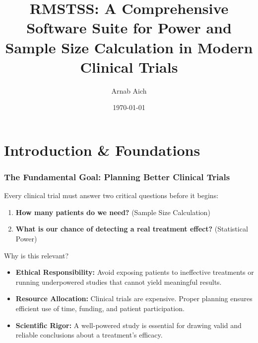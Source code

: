 \documentclass{beamer}
\date{}
\title[RMSTSS]{RMSTSS: A Comprehensive Software Suite for Power and Sample Size Calculation in Modern Clinical Trials}
\author{Arnab Aich}
\institute{Florida State University}
\date{\today}
\begin{document}
\begin{frame}
  \titlepage
\end{frame}

\section{Introduction \& Foundations}

\begin{frame}
\frametitle{The Fundamental Goal: Planning Better Clinical Trials}
Every clinical trial must answer two critical questions before it begins:

\begin{enumerate}
    \item \textbf{How many patients do we need?} (Sample Size Calculation)
    \item \textbf{What is our chance of detecting a real treatment effect?} (Statistical Power)
\end{enumerate}

\vspace{1em}

\begin{block}{Why is this relevant?}
\begin{itemize}
    \item \textbf{Ethical Responsibility:} Avoid exposing patients to ineffective treatments or running underpowered studies that cannot yield meaningful results.
    \item \textbf{Resource Allocation:} Clinical trials are expensive. Proper planning ensures efficient use of time, funding, and patient participation.
    \item \textbf{Scientific Rigor:} A well-powered study is essential for drawing valid and reliable conclusions about a treatment's efficacy.
\end{itemize}
\end{block}
\end{frame}
\end{document}
